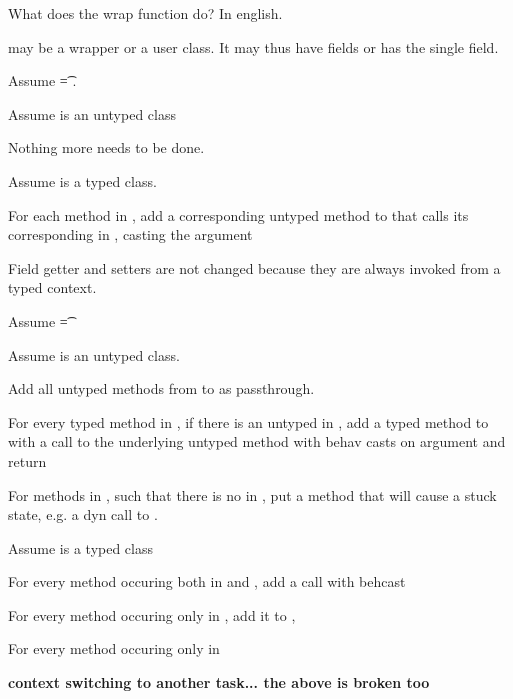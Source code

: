 \documentclass[a4paper,UKenglish,final]{lipics}
\begin{document}
\begin{mathpar}
\end{mathpar}

What does the wrap function do? In english.

\C may be a wrapper or a user class. It may thus have fields or has the
single \that field.


Assume \t = \any. 

Assume \C is an untyped class

Nothing more needs to be done.

Assume \C is a typed class.

For each method \m in \C, add a corresponding untyped method \m to \D that calls its corresponding \m in \C, casting the argument

Field getter and setters are not changed because they are always invoked
from a typed context.

Assume \t = \Cp 

Assume \C is an untyped class.

Add all untyped methods from \C to \D as  passthrough. 

For every typed method \m in \Cp,  if there is an untyped \m in \C, add a typed method \m to \D with a call to the underlying untyped method with behav casts on argument and return

For methods \m in \Cp, such that there is no \m in \C, put a method that will cause a stuck state, e.g. a dyn call to \m.

Assume \C is a typed class

For every method \m occuring both in \C and \Cp, add a call with behcast

For every method \m occuring only in \C, add it to \D, 

For every method \m occuring only in \Cp


{\bf context switching to another task... the above is broken too}



\hrulefill
\end{document}
